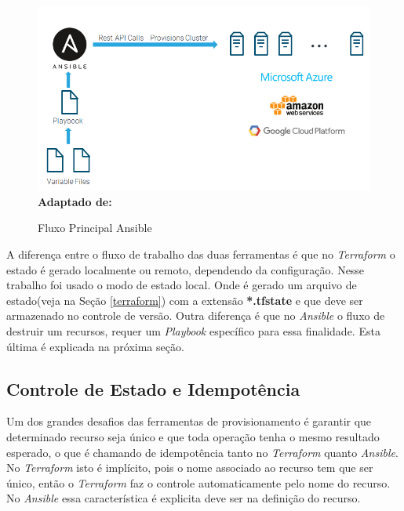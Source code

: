 \begin{figure}[H]
	\centering	
	\caption[\hspace{0.1cm}Fluxo Principal Ansible]{Fluxo Principal Ansible}
	\vspace{-0.4cm}
	\includegraphics[width=1.0\textwidth]{artigo/figuras/Ansible_workflow2.png}
	 \vspace{-0.2cm}
	\\\textbf{\footnotesize Adaptado de: \cite{cloudera}}
	\label{fig:figura8}
\end{figure}
\vspace{-0.5cm}

\hfill




A diferença entre o fluxo de trabalho das duas ferramentas é que no \textit{Terraform} o estado é gerado localmente ou remoto, dependendo da configuração. Nesse trabalho foi usado o modo de estado local. Onde é gerado um arquivo de estado(veja na Seção \ref{terraform}) com a extensão \textbf{*.tfstate} e que deve ser armazenado no controle de versão. Outra diferença é que no \textit{Ansible} o fluxo de destruir um recursos, requer um \textit{Playbook} específico para essa finalidade. Esta última é explicada na próxima seção.  

\subsection{Controle de Estado e Idempotência} \label{idem}
Um dos grandes desafios das ferramentas de provisionamento é garantir que determinado recurso seja único e que toda operação tenha o mesmo resultado esperado, o que é chamando de idempotência tanto no \textit{Terraform} quanto \textit{Ansible}. No \textit{Terraform} isto é implícito, pois o nome associado ao recurso tem que ser único, então o \textit{Terraform} faz o controle automaticamente pelo nome do recurso. No \textit{Ansible} essa característica é explicita deve ser na definição do recurso.

